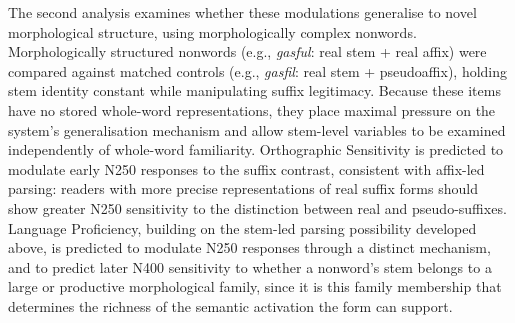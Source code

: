	The second analysis examines whether these modulations generalise to novel morphological structure, using morphologically complex nonwords. Morphologically structured nonwords (e.g., \textit{gasful}: real stem + real affix) were compared against matched controls (e.g., \textit{gasfil}: real stem + pseudoaffix), holding stem identity constant while manipulating suffix legitimacy. Because these items have no stored whole-word representations, they place maximal pressure on the system's generalisation mechanism and allow stem-level variables to be examined independently of whole-word familiarity. Orthographic Sensitivity is predicted to modulate early N250 responses to the suffix contrast, consistent with affix-led parsing: readers with more precise representations of real suffix forms should show greater N250 sensitivity to the distinction between real and pseudo-suffixes. Language Proficiency, building on the stem-led parsing possibility developed above, is predicted to modulate N250 responses through a distinct mechanism, and to predict later N400 sensitivity to whether a nonword's stem belongs to a large or productive morphological family, since it is this family membership that determines the richness of the semantic activation the form can support.